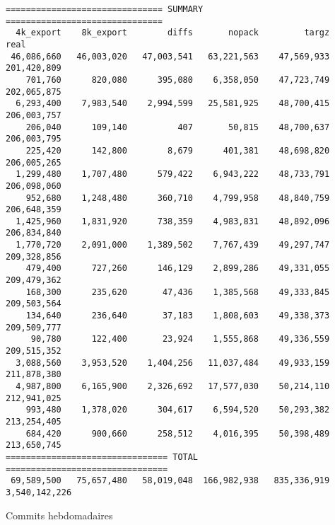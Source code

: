\documentclass[a4paper,twocolumn]{article}
\begin{document}
\begin{table*}[ht]
\begin{verbatim}
=============================== SUMMARY ===============================
  4k_export    8k_export        diffs       nopack         targz           real
 46,086,660   46,003,020   47,003,541   63,221,563    47,569,933    201,420,809
    701,760      820,080      395,080    6,358,050    47,723,749    202,065,875
  6,293,400    7,983,540    2,994,599   25,581,925    48,700,415    206,003,757
    206,040      109,140          407       50,815    48,700,637    206,003,795
    225,420      142,800        8,679      401,381    48,698,820    206,005,265
  1,299,480    1,707,480      579,422    6,943,222    48,733,791    206,098,060
    952,680    1,248,480      360,710    4,799,958    48,840,759    206,648,359
  1,425,960    1,831,920      738,359    4,983,831    48,892,096    206,834,840
  1,770,720    2,091,000    1,389,502    7,767,439    49,297,747    209,328,856
    479,400      727,260      146,129    2,899,286    49,331,055    209,479,362
    168,300      235,620       47,436    1,385,568    49,333,845    209,503,564
    134,640      236,640       37,183    1,808,603    49,338,373    209,509,777
     90,780      122,400       23,924    1,555,868    49,336,559    209,515,352
  3,088,560    3,953,520    1,404,256   11,037,484    49,933,159    211,878,380
  4,987,800    6,165,900    2,326,692   17,577,030    50,214,110    212,941,025
    993,480    1,378,020      304,617    6,594,520    50,293,382    213,254,405
    684,420      900,660      258,512    4,016,395    50,398,489    213,650,745
================================ TOTAL ================================
 69,589,500   75,657,480   58,019,048  166,982,938   835,336,919  3,540,142,226
\end{verbatim}
\caption{Commits hebdomadaires}
\label{tab:commits-weekly}
\end{table*}
\end{document}
